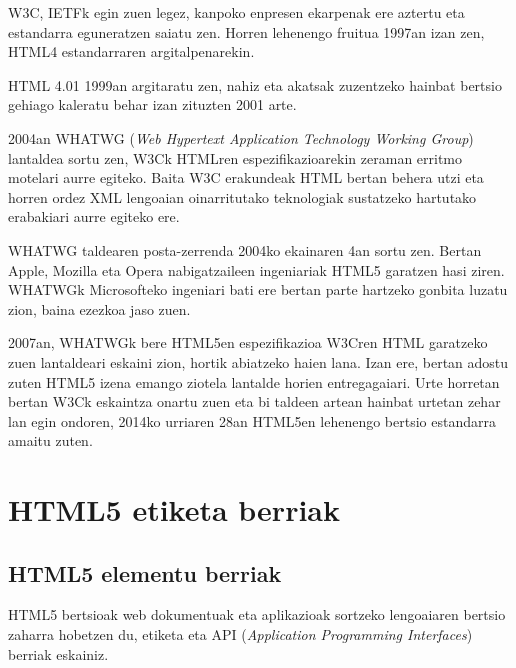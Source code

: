 W3C, IETFk egin zuen legez, kanpoko enpresen ekarpenak ere aztertu eta estandarra eguneratzen saiatu zen. Horren lehenengo fruitua 1997an izan zen, HTML4 estandarraren argitalpenarekin.

HTML 4.01 1999an argitaratu zen, nahiz eta akatsak zuzentzeko hainbat bertsio gehiago kaleratu behar izan zituzten 2001 arte.

2004an  WHATWG (\textit{Web Hypertext Application Technology Working Group}) lantaldea sortu zen, W3Ck HTMLren espezifikazioarekin zeraman erritmo motelari aurre egiteko. Baita W3C erakundeak HTML bertan behera utzi eta horren ordez XML lengoaian oinarritutako teknologiak sustatzeko hartutako erabakiari aurre egiteko ere.

WHATWG taldearen posta-zerrenda 2004ko ekainaren 4an sortu zen. Bertan Apple, Mozilla eta Opera nabigatzaileen ingeniariak HTML5 garatzen hasi ziren. WHATWGk Microsofteko ingeniari bati ere bertan parte hartzeko gonbita luzatu zion, baina ezezkoa jaso zuen.
 
2007an, WHATWGk bere HTML5en espezifikazioa W3Cren HTML garatzeko zuen lantaldeari eskaini zion, hortik abiatzeko haien lana. Izan ere, bertan adostu zuten HTML5 izena emango ziotela lantalde horien entregagaiari. Urte horretan bertan W3Ck eskaintza onartu zuen eta bi taldeen artean hainbat urtetan zehar lan egin ondoren, 2014ko urriaren 28an HTML5en lehenengo bertsio estandarra amaitu zuten.







\section{HTML5 etiketa berriak}

\subsection{HTML5 elementu berriak}

HTML5 bertsioak web dokumentuak eta aplikazioak sortzeko lengoaiaren bertsio zaharra hobetzen du, etiketa eta API (\textit{Application Programming Interfaces}) berriak eskainiz.

